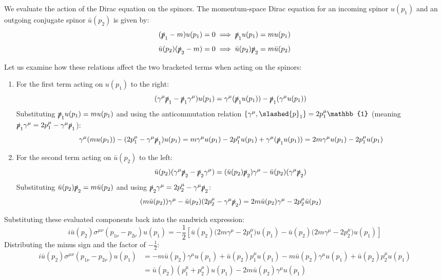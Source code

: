We evaluate the action of the Dirac equation on the spinors. The momentum-space Dirac equation for an incoming spinor $u(p_1)$ and an outgoing conjugate spinor $\bar{u}(p_2)$ is given by:
\[
    (\slashed{p}_1 - m) u(p_1) = 0 \implies \slashed{p}_1 u(p_1) = m u(p_1)
\]
\[
    \bar{u}(p_2) (\slashed{p}_2 - m) = 0 \implies \bar{u}(p_2) \slashed{p}_2 = m \bar{u}(p_2)
\]

Let us examine how these relations affect the two bracketed terms when acting on the spinors:
\begin{enumerate}
    \item For the first term acting on $u(p_1)$ to the right:
          \[
              (\gamma^\mu \slashed{p}_1 - \slashed{p}_1 \gamma^\mu) u(p_1) = \gamma^\mu (\slashed{p}_1 u(p_1)) - \slashed{p}_1 (\gamma^\mu u(p_1))
          \]
          Substituting $\slashed{p}_1 u(p_1) = m u(p_1)$ and using the anticommutation relation $\{ \gamma^\mu, \slashed{p}_1 \} = 2p_1^\mu \mathbb{1}$ (meaning $\slashed{p}_1 \gamma^\mu = 2p_1^\mu - \gamma^\mu \slashed{p}_1$):
          \[
              \gamma^\mu (m u(p_1)) - (2p_1^\mu - \gamma^\mu \slashed{p}_1) u(p_1) = m \gamma^\mu u(p_1) - 2p_1^\mu u(p_1) + \gamma^\mu (\slashed{p}_1 u(p_1)) = 2m \gamma^\mu u(p_1) - 2p_1^\mu u(p_1)
          \]
    \item For the second term acting on $\bar{u}(p_2)$ to the left:
          \[
              \bar{u}(p_2) (\gamma^\mu \slashed{p}_2 - \slashed{p}_2 \gamma^\mu) = (\bar{u}(p_2) \slashed{p}_2) \gamma^\mu - \bar{u}(p_2) (\gamma^\mu \slashed{p}_2)
          \]
          Substituting $\bar{u}(p_2) \slashed{p}_2 = m \bar{u}(p_2)$ and using $\slashed{p}_2 \gamma^\mu = 2p_2^\mu - \gamma^\mu \slashed{p}_2$:
          \[
              (m \bar{u}(p_2)) \gamma^\mu - \bar{u}(p_2) (2p_2^\mu - \gamma^\mu \slashed{p}_2) = 2m \bar{u}(p_2) \gamma^\mu - 2p_2^\mu \bar{u}(p_2)
          \]
\end{enumerate}

Substituting these evaluated components back into the sandwich expression:
\[
    i \bar{u}(p_2) \sigma^{\mu\nu} (p_{1\nu} - p_{2\nu}) u(p_1) = -\frac{1}{2} \left[ \bar{u}(p_2) \big( 2m \gamma^\mu - 2p_1^\mu \big) u(p_1) - \bar{u}(p_2) \big( 2m \gamma^\mu - 2p_2^\mu \big) u(p_1) \right]
\]
Distributing the minus sign and the factor of $-\frac{1}{2}$:
\[
    \begin{aligned}
        i \bar{u}(p_2) \sigma^{\mu\nu} (p_{1\nu} - p_{2\nu}) u(p_1) & = -m \bar{u}(p_2) \gamma^\mu u(p_1) + \bar{u}(p_2) p_1^\mu u(p_1) - m \bar{u}(p_2) \gamma^\mu u(p_1) + \bar{u}(p_2) p_2^\mu u(p_1) \\
                                                                    & = \bar{u}(p_2) (p_1^\mu + p_2^\mu) u(p_1) - 2m \bar{u}(p_2) \gamma^\mu u(p_1)
    \end{aligned}
\]

